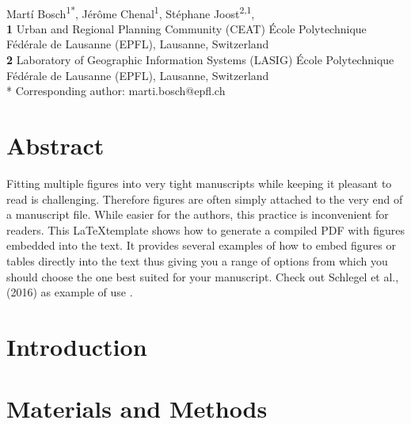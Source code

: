 \documentclass[10pt,letterpaper]{article}
\begin{document}
\vspace*{0.35in}

\begin{flushleft}
{\Large
\textbf{}
}
\newline
\\
Mart\'i Bosch\textsuperscript{1*},
J\'er\^ome Chenal\textsuperscript{1},
St\'ephane Joost\textsuperscript{2,1},
\\
\bigskip
\textbf{1} Urban and Regional Planning Community (CEAT) \'Ecole Polytechnique F\'ed\'erale de Lausanne (EPFL), Lausanne, Switzerland
\\
\textbf{2} Laboratory of Geographic Information Systems (LASIG) \'Ecole Polytechnique F\'ed\'erale de Lausanne (EPFL), Lausanne, Switzerland
\\
\bigskip
* Corresponding author: marti.bosch@epfl.ch

\end{flushleft}

\section*{Abstract}
Fitting multiple figures into very tight manuscripts while keeping it pleasant to read is challenging. Therefore figures are often simply attached to the very end of a manuscript file. While easier for the authors, this practice is inconvenient for readers. This \LaTeX template shows how to generate a compiled PDF with figures embedded into the text. It provides several examples of how to embed figures or tables directly into the text thus giving you a range of options from which you should choose the one best suited for your manuscript. Check out Schlegel et al., (2016) as example of use \cite{liu2016general}.

\linenumbers

\section*{Introduction}


\section*{Materials and Methods}
\end{document}
